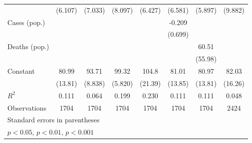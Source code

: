 \documentclass{article}
\begin{document}
{\begin{longtable}{l*{7}{c}}
                &  (6.107)         &  (7.033)         &  (8.097)         &  (6.427)         &  (6.581)         &  (5.897)         &  (9.882)         \\
Cases (pop.)    &                  &                  &                  &                  &   -0.209         &                  &                  \\
                &                  &                  &                  &                  &  (0.699)         &                  &                  \\
Deaths (pop.)   &                  &                  &                  &                  &                  &    60.51         &                  \\
                &                  &                  &                  &                  &                  &  (55.98)         &                  \\
Constant        &    80.99\sym{***}&    93.71\sym{***}&    99.32\sym{***}&    104.8\sym{***}&    81.01\sym{***}&    80.97\sym{***}&    82.03\sym{***}\\
                &  (13.81)         &  (8.838)         &  (5.820)         &  (21.39)         &  (13.85)         &  (13.81)         &  (16.26)         \\
\hline
\(R^{2}\)       &    0.111         &    0.064         &    0.199         &    0.230         &    0.111         &    0.111         &    0.048         \\
Observations    &     1704         &     1704         &     1704         &     1704         &     1704         &     1704         &     2424         \\
\hline\hline
\multicolumn{8}{l}{\footnotesize Standard errors in parentheses}\\
\multicolumn{8}{l}{\footnotesize \sym{*} \(p<0.05\), \sym{**} \(p<0.01\), \sym{***} \(p<0.001\)}\\
\end{longtable}
}
\end{document}
